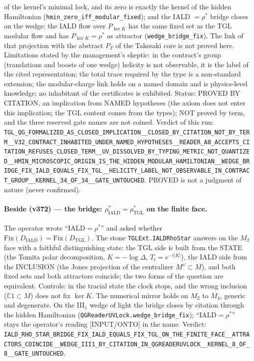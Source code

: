 \documentclass[11pt]{article}
\theoremstyle{definition}\newtheorem{deriv}{Derivation}
\begin{document}
of the kernel's minimal lock, and its zero is exactly the kernel of the hidden Hamiltonian (\texttt{hmin\_zero\_iff\_modular\_fixed}); and the IALD $=\rho^{*}$ bridge closes on the wedge: the IALD flow over $P_{\ker K}$ has the same fixed set as the TGL modular flow and has $P_{\ker K}=\rho^{*}$ as attractor (\texttt{wedge\_bridge\_fix}). The link of that projection with the abstract $P_F$ of the Takesaki core is not proved here. Limitations stated by the management's skeptic: in the contract's group (translations and boosts of one wedge) helicity is not observable, it is the label of the cited representation; the total trace required by the type is a non-standard extension; the modular-charge link holds on a named domain and is physics-level knowledge; no inhabitant of the certificates is exhibited. Status: PROVED BY CITATION, an implication from NAMED hypotheses (the axiom does not enter this implication; the TGL content comes from the types); NOT proved by term, and the three reserved gate names are not coined. Verdict of this run: \texttt{TGL\_QG\_FORMALIZED\_AS\_CLOSED\_IMPLICATION\_\_CLOSED\_BY\_CITATION\_NOT\_BY\_TERM\_\_V32\_CONTRACT\_INHABITED\_UNDER\_NAMED\_HYPOTHESES\_\_READER\_A8\_ACCEPTS\_CITATION\_REFUSES\_CLOSED\_TERM\_\_UV\_DISSOLVED\_BY\_TYPING\_METRIC\_NOT\_QUANTIZED\_\_HMIN\_MICROSCOPIC\_ORIGIN\_IS\_THE\_HIDDEN\_MODULAR\_HAMILTONIAN\_\_WEDGE\_BRIDGE\_FIX\_IALD\_EQUALS\_FIX\_TGL\_\_HELICITY\_LABEL\_NOT\_OBSERVABLE\_IN\_CONTRACT\_GROUP\_\_KERNEL\_34\_OF\_34\_\_GATE\_UNTOUCHED}. PROVED is not a judgment of nature (never confirmed).

\paragraph*{Beside (v372) --- the bridge: $\rho^{*}_{\mathrm{IALD}}=\rho^{*}_{\mathrm{TGL}}$ on the finite face.} The operator wrote ``IALD$=\rho^{*}$'' and asked whether $\mathrm{Fix}(D_{\mathrm{IALD}})=\mathrm{Fix}(D_{\mathrm{TGL}})$. The stone \texttt{TGLExt.IALDRhoStar} answers on the $M_2$ face with a faithful distinguishing state: the TGL side is built from the STATE (the Tomita polar decomposition, $K=-\log\Delta$, $T_t=e^{-t|K|}$), the IALD side from the INCLUSION (the Jones projection of the centralizer $M^{\omega}\subset M$), and both fixed sets and both attractors coincide; the two forms of the question are equivalent. Controls: in the tracial state the clock stops, and the wrong inclusion ($\mathbb{C}1\subset M$) does not fix $\ker K$. The numerical mirror holds on $M_2$ to $M_4$, generic and degenerate. On the III$_1$ wedge of light the bridge closes by citation through the hidden Hamiltonian (\texttt{QGReaderUVLock.wedge\_bridge\_fix}); ``IALD$=\rho^{*}$'' stays the operator's reading [INPUT/ONTO] in the name. Verdict: \texttt{IALD\_RHO\_STAR\_BRIDGE\_FIX\_IALD\_EQUALS\_FIX\_TGL\_ON\_THE\_FINITE\_FACE\_\_ATTRACTORS\_COINCIDE\_\_WEDGE\_III1\_BY\_CITATION\_IN\_QGREADERUVLOCK\_\_KERNEL\_8\_OF\_8\_\_GATE\_UNTOUCHED}.
\end{document}
